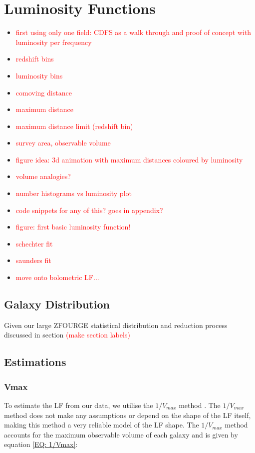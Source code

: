 \chapter{Luminosity Functions}
\thispagestyle{empty}

\begin{itemize}
    \item \textcolor{red}{first using only one field: CDFS as a walk through and proof of concept with luminosity per frequency}
    \item \textcolor{red}{redshift bins}
    \item \textcolor{red}{luminosity bins}
    \item \textcolor{red}{comoving distance}
    \item \textcolor{red}{maximum distance}
    \item \textcolor{red}{maximum distance limit (redshift bin)}
    \item \textcolor{red}{survey area, observable volume}
    \item \textcolor{red}{figure idea: 3d animation with maximum distances coloured by luminosity}
    \item \textcolor{red}{volume analogies?}
    \item \textcolor{red}{number histograms vs luminosity plot}
    \item \textcolor{red}{code snippets for any of this? goes in appendix?}
    \item \textcolor{red}{figure: first basic luminosity function!}
    \item \textcolor{red}{schechter fit}
    \item \textcolor{red}{saunders fit}
    \item \textcolor{red}{move onto bolometric LF...}
\end{itemize}

\section{Galaxy Distribution}
Given our large ZFOURGE statistical distribution and reduction process discussed in section \textcolor{red}{(make section labels)}

\section{Estimations}
\subsection{Vmax}
To estimate the LF from our data, we utilise the $1/V_{max}$ method \citep{schmidt_space_1968}. The $1/V_{max}$ method does not make any assumptions or depend on the shape of the LF itself, making this method a very reliable model of the LF shape. The $1/V_{max}$ method accounts for the maximum observable volume of each galaxy and is given by equation \ref{EQ: 1/Vmax}:

